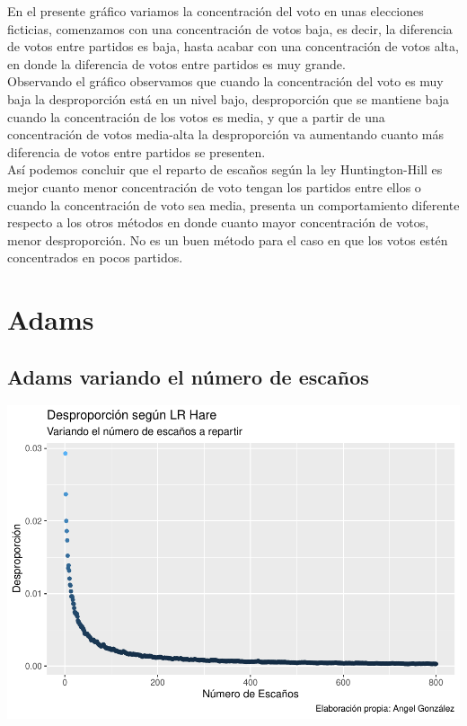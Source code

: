 \documentclass[12pt,a4paper,]{book}
\numberwithin{dummy}{section}
\theoremstyle{ocrenumbox}
\theoremstyle{blacknumex}
\theoremstyle{blacknumbox}
\theoremstyle{ocrenum}
\theoremstyle{ocrenum}
\begin{document}
En el presente gráfico variamos la concentración del voto en unas
elecciones ficticias, comenzamos con una concentración de votos baja, es
decir, la diferencia de votos entre partidos es baja, hasta acabar con
una concentración de votos alta, en donde la diferencia de votos entre
partidos es muy grande.\\
Observando el gráfico observamos que cuando la concentración del voto es
muy baja la desproporción está en un nivel bajo, desproporción que se
mantiene baja cuando la concentración de los votos es media, y que a
partir de una concentración de votos media-alta la desproporción va
aumentando cuanto más diferencia de votos entre partidos se presenten.\\
Así podemos concluir que el reparto de escaños según la ley
Huntington-Hill es mejor cuanto menor concentración de voto tengan los
partidos entre ellos o cuando la concentración de voto sea media,
presenta un comportamiento diferente respecto a los otros métodos en
donde cuanto mayor concentración de votos, menor desproporción. No es un
buen método para el caso en que los votos estén concentrados en pocos
partidos.

\hypertarget{adams}{%
\section{Adams}\label{adams}}

\hypertarget{adams-variando-el-nuxfamero-de-escauxf1os}{%
\subsection{Adams variando el número de
escaños}\label{adams-variando-el-nuxfamero-de-escauxf1os}}

\begin{center}\includegraphics[width=0.95\linewidth]{figurasR/unnamed-chunk-41-1} \end{center}
\end{document}
